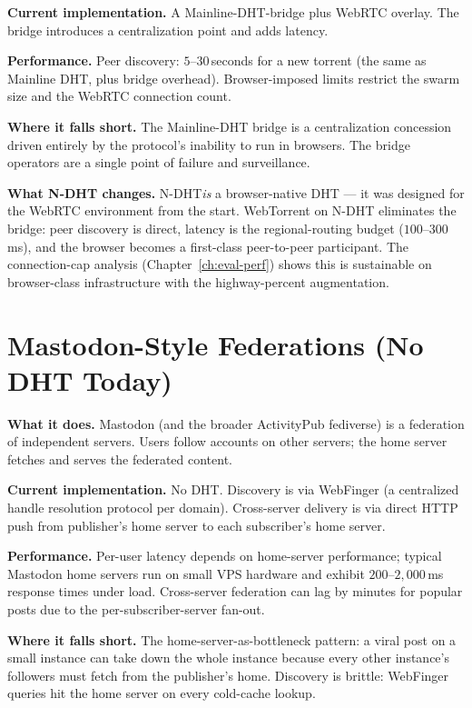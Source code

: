 \documentclass[twoside,nobib]{tufte-book}
\newcommand{\NDHT}{N-DHT\xspace}
\begin{document}
\textbf{Current implementation.} A Mainline-DHT-bridge plus
WebRTC overlay. The bridge introduces a centralization point
and adds latency.

\textbf{Performance.} Peer discovery: $5$--$30$\,seconds for a
new torrent (the same as Mainline DHT, plus bridge overhead).
Browser-imposed limits restrict the swarm size and the WebRTC
connection count.

\textbf{Where it falls short.} The Mainline-DHT bridge is a
centralization concession driven entirely by the protocol's
inability to run in browsers. The bridge operators are a
single point of failure and surveillance.

\textbf{What \NDHT changes.} \NDHT \emph{is} a browser-native
DHT --- it was designed for the WebRTC environment from the
start. WebTorrent on \NDHT eliminates the bridge: peer discovery
is direct, latency is the regional-routing budget
($100$--$300$\,ms), and the browser becomes a first-class
peer-to-peer participant. The connection-cap analysis
(Chapter~\ref{ch:eval-perf}) shows this is sustainable on
browser-class infrastructure with the highway-percent
augmentation.

\section{Mastodon-Style Federations (No DHT Today)}

\textbf{What it does.} Mastodon (and the broader ActivityPub
fediverse) is a federation of independent servers. Users
follow accounts on other servers; the home server fetches and
serves the federated content.

\textbf{Current implementation.} No DHT. Discovery is via
WebFinger (a centralized handle resolution protocol per
domain). Cross-server delivery is via direct HTTP push from
publisher's home server to each subscriber's home server.

\textbf{Performance.} Per-user latency depends on home-server
performance; typical Mastodon home servers run on small VPS
hardware and exhibit $200$--$2{,}000$\,ms response times under
load. Cross-server federation can lag by minutes for popular
posts due to the per-subscriber-server fan-out.

\textbf{Where it falls short.} The home-server-as-bottleneck
pattern: a viral post on a small instance can take down the
whole instance because every other instance's followers must
fetch from the publisher's home. Discovery is brittle: WebFinger
queries hit the home server on every cold-cache lookup.
\end{document}
